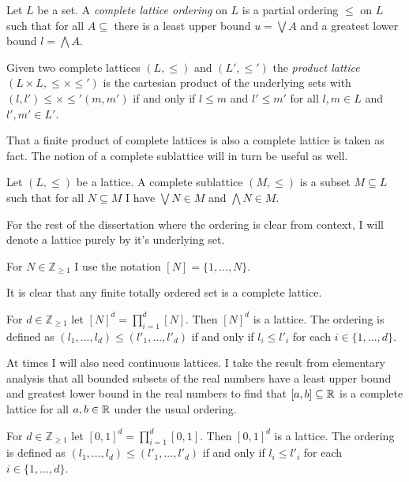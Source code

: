 \begin{definition}
  Let $L$ be a set. A \emph{complete lattice ordering} on $L$ is a partial ordering $\leq$ on $L$ such that for all 
  $A \subseteq$ there is a least upper bound $u = \bigvee A$ and a greatest lower bound $l = \bigwedge A$.
\end{definition}
\begin{definition}
  Given two complete lattices $(L, \leq)$ and $(L', \leq')$ the \emph{product lattice} $(L \times L, \leq \times \leq')$
  is the cartesian product of the underlying sets with $(l, l') \leq \times \leq' (m, m')$ if and only if
  $l \leq m$ and $l' \leq m'$ for all $l, m \in L$ and $l', m' \in L'$.
\end{definition}
That a finite product of complete lattices is also a complete lattice is taken as fact.
The notion of a complete sublattice will in turn be useful as well.
\begin{definition}[Sublattice]
  Let $(L, \leq)$ be a lattice. A complete sublattice $(M, \leq)$ is a
  subset $M \subseteq L$ such that for all $N \subseteq M$ I have $\bigvee N \in M$
  and $\bigwedge N \in M$.
\end{definition}
For the rest of the dissertation where the ordering is clear from context, I will denote a lattice purely by
it's underlying set.
\begin{notation}
  For $N \in \mathbb{Z}_{\geq 1}$ I use the notation $[N] = \{1, ..., N\}$.
\end{notation}
It is clear that any finite totally ordered set is a complete lattice.
\begin{cor}
  For $d \in \mathbb{Z}_{\geq 1}$ let $[N]^d = \prod_{i=1}^d [N]$. Then $[N]^d$ is a lattice. 
  The ordering is defined as $(l_1, ..., l_d) \leq (l'_1, ..., l'_d)$
  if and only if $l_i \leq l'_i$ for each $i \in \{1, ..., d\}$.
\end{cor}
At times I will also need continuous lattices. I take the result from elementary analysis
that all bounded subsets of the real numbers have a least upper bound and greatest lower bound
in the real numbers to find that $[a, b] \subseteq \mathbb{R}$ is a complete lattice for all $a, b \in \mathbb{R}$
under the usual ordering.
\begin{cor}
  For $d \in \mathbb{Z}_{\geq 1}$ let $[0, 1]^d = \prod_{i=1}^d [0, 1]$. Then $[0, 1]^d$ is a lattice. 
  The ordering is defined as $(l_1, ..., l_d) \leq (l'_1, ..., l'_d)$
  if and only if $l_i \leq l'_i$ for each $i \in \{1, ..., d\}$.
\end{cor}
